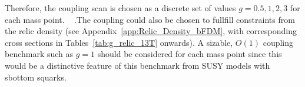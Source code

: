 Therefore, the coupling scan is chosen as a discrete set of values $g=0.5,1,2,3$ for each mass point.
~
.The coupling could also be chosen to fullfill constraints from the relic density (see Appendix~\ref{app:Relic_Density_bFDM}, with corresponding cross sections in Tables~\ref{tab:g_relic_13T} onwards). A sizable, $O(1)$ coupling benchmark such as $g=1$ should be considered for each mass point since this would be a distinctive feature of this benchmark from SUSY models with sbottom squarks.

